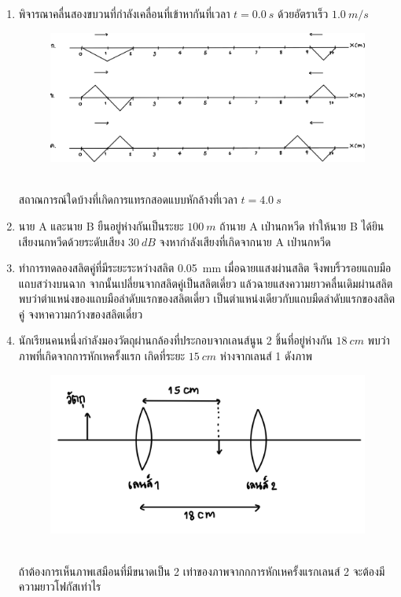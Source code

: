 \documentclass[a4paper,12pt]{article}
\begin{document}
\begin{enumerate}
		\item พิจารณาคลื่นสองขบวนที่กำลังเคลื่อนที่เข้าหากันที่เวลา \(t=\SI{0.0}{s}\) ด้วยอัตราเร็ว \(\SI{1.0}{m/s}\)
			\begin{figure}[h]
			\centering
			\includegraphics[width=0.7\linewidth]{9}
		\end{figure}\\
		สถาณการณ์ใดบ้างที่เกิดการแทรกสอดแบบหักล้างที่เวลา \(t=\SI{4.0}{s}\)
			\vspace{4cm}
		
		\item นาย A และนาย B ยืนอยู่ห่างกันเป็นระยะ \(\SI{100}{m}\) ถ้านาย A เป่านกหวีด ทำให้นาย B ได้ยินเสียงนกหวีดด้วยระดับเสียง \(\SI{30}{dB}\) จงหากำลังเสียงที่เกิดจากนาย A เป่านกหวีด
			\vspace{4cm}
		
		\item ทำการทดลองสลิตคู่ที่มีระยะระหว่างสลิต \SI{0.05}{mm} เมื่อฉายเแสงผ่านสลิต จึงพบริ้วรอยแถบมือแถบสว่างบนฉาก จากนั้นเปลี่ยนจากสลิตคู่เป็นสลิตเดี่ยว แล้วฉายแสงความยาวคลื่นเดิมผ่านสลิต พบว่าตำแหน่งของแถบมือลำดับแรกของสลิตเดี่ยว เป็นตำแหน่งเดียวกับแถบมืดลำดับแรกของสลิตคู่ จงหาความกว้างของสลิตเดี่ยว
			\vspace{4cm}
		
		\item นักเรียนคนหนึ่งกำลังมองวัตถุผ่านกล้องที่ประกอบจากเลนส์นูน 2 ชิ้นที่อยู่ห่างกัน \(\SI{18}{cm}\) พบว่าภาพที่เกิดจากการหักเหครั้งแรก เกิดที่ระยะ \(\SI{15}{cm}\) ห่างจากเลนส์ 1 ดังภาพ 
		\begin{figure}[h]
			\centering
			\includegraphics[width=0.7\linewidth]{12}
		\end{figure}\\
	ถ้าต้องการเห็นภาพเสมือนที่มีขนาดเป็น 2 เท่าของภาพจากกการหักเหครั้งแรกเลนส์ 2 จะต้องมีความยาวโฟกัสเท่าไร
			\vspace{4cm}
		

\end{enumerate}
\end{document}
